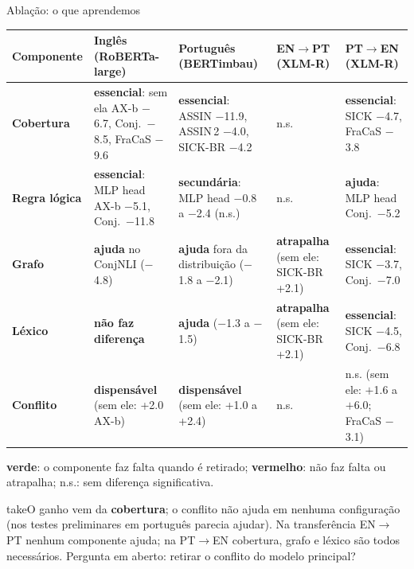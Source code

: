 \documentclass[aspectratio=169,10pt]{beamer}
\newcommand{\up}[1]{\textcolor{logic}{\textbf{#1}}}
\newcommand{\down}[1]{\textcolor{relneg}{\textbf{#1}}}
\newcommand{\take}[1]{\vspace{4pt}\begin{beamercolorbox}[sep=5pt,rounded=true]{take}\small #1\end{beamercolorbox}}
\begin{document}
\begin{frame}{Ablação: o que aprendemos}
\small
\footnotesize\setlength{\tabcolsep}{3pt}\begin{tabular}{@{}>{\raggedright\arraybackslash}p{1.6cm}>{\raggedright\arraybackslash}p{3.3cm}>{\raggedright\arraybackslash}p{3.3cm}>{\raggedright\arraybackslash}p{2.5cm}>{\raggedright\arraybackslash}p{2.7cm}@{}}
\toprule
Componente & Inglês (RoBERTa-large) & Português (BERTimbau) & EN$\to$PT (XLM-R) & PT$\to$EN (XLM-R) \\
\midrule
\textbf{Cobertura} & \up{essencial}: sem ela AX-b $-$6.7, Conj.\ $-$8.5, FraCaS $-$9.6 & \up{essencial}: ASSIN $-$11.9, ASSIN\,2 $-$4.0, SICK-BR $-$4.2 & n.s. & \up{essencial}: SICK $-$4.7, FraCaS $-$3.8 \\
\textbf{Regra lógica} & \up{essencial}: MLP head AX-b $-$5.1, Conj.\ $-$11.8 & \down{secundária}: MLP head $-$0.8 a $-$2.4 (n.s.) & n.s. & \up{ajuda}: MLP head Conj.\ $-$5.2 \\
\textbf{Grafo} & \up{ajuda} no ConjNLI ($-$4.8) & \up{ajuda} fora da distribuição ($-$1.8 a $-$2.1) & \down{atrapalha} (sem ele: SICK-BR +2.1) & \up{essencial}: SICK $-$3.7, Conj.\ $-$7.0 \\
\textbf{Léxico} & \down{não faz diferença} & \up{ajuda} ($-$1.3 a $-$1.5) & \down{atrapalha} (sem ele: SICK-BR +2.1) & \up{essencial}: SICK $-$4.5, Conj.\ $-$6.8 \\
\textbf{Conflito} & \down{dispensável} (sem ele: +2.0 AX-b) & \down{dispensável} (sem ele: +1.0 a +2.4) & n.s. & n.s. (sem ele: $+$1.6 a $+$6.0; FraCaS $-$3.1) \\
\bottomrule
\end{tabular}
{\scriptsize\textcolor{logic}{\textbf{verde}}: o componente faz falta quando é retirado; \textcolor{relneg}{\textbf{vermelho}}: não faz falta ou atrapalha; n.s.: sem diferença significativa.}
\take{O ganho vem da \textbf{cobertura}; o conflito não ajuda em nenhuma configuração (nos testes preliminares em português parecia ajudar). Na transferência EN$\to$PT nenhum componente ajuda; na PT$\to$EN cobertura, grafo e léxico são todos necessários. Pergunta em aberto: retirar o conflito do modelo principal?}
\end{frame}
\end{document}
